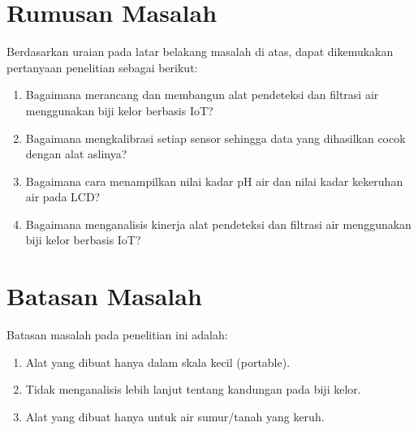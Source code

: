 \section{Rumusan Masalah}

Berdasarkan uraian pada latar belakang masalah di atas, dapat dikemukakan pertanyaan penelitian sebagai berikut:

\begin{enumerate}[topsep=0pt,itemsep=0pt,partopsep=0pt, parsep=0pt]
    \item Bagaimana merancang dan membangun alat pendeteksi dan filtrasi air menggunakan biji kelor berbasis IoT?
    \item Bagaimana mengkalibrasi setiap sensor sehingga data yang dihasilkan cocok dengan alat aslinya?
    \item Bagaimana cara menampilkan nilai kadar pH air dan nilai kadar kekeruhan air pada LCD?
    \item Bagaimana menganalisis kinerja alat pendeteksi dan filtrasi air menggunakan biji kelor berbasis IoT?
\end{enumerate}

\section{Batasan Masalah}

Batasan masalah pada penelitian ini adalah:

\begin{enumerate}[topsep=0pt,itemsep=0pt,partopsep=0pt, parsep=0pt]
    \item Alat yang dibuat hanya dalam skala kecil (portable).
    \item Tidak menganalisis lebih lanjut tentang kandungan pada biji kelor.
    \item Alat yang dibuat hanya untuk air sumur/tanah yang keruh.
\end{enumerate}